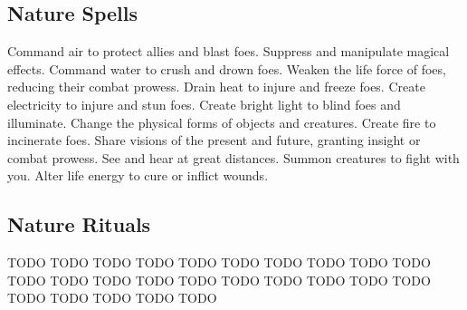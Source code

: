 \subsection{Nature Spells}\label{Nature Spells}
\begin{spelllist}
 Command air to protect allies and blast foes.
 Suppress and manipulate magical effects.
 Command water to crush and drown foes.
 Weaken the life force of foes, reducing their combat prowess.
 Drain heat to injure and freeze foes.
 Create electricity to injure and stun foes.
 Create bright light to blind foes and illuminate.
 Change the physical forms of objects and creatures.
 Create fire to incinerate foes.
 Share visions of the present and future, granting insight or combat prowess.
 See and hear at great distances.
 Summon creatures to fight with you.
 Alter life energy to cure or inflict wounds.
\end{spelllist}
\subsection{Nature Rituals}\label{Nature Rituals}
\begin{spelllist}
 TODO
 TODO
 TODO
 TODO
 TODO
 TODO
 TODO
 TODO
 TODO
 TODO
 TODO
 TODO
 TODO
 TODO
 TODO
 TODO
 TODO
 TODO
 TODO
 TODO
 TODO
 TODO
 TODO
 TODO
 TODO
\end{spelllist}
